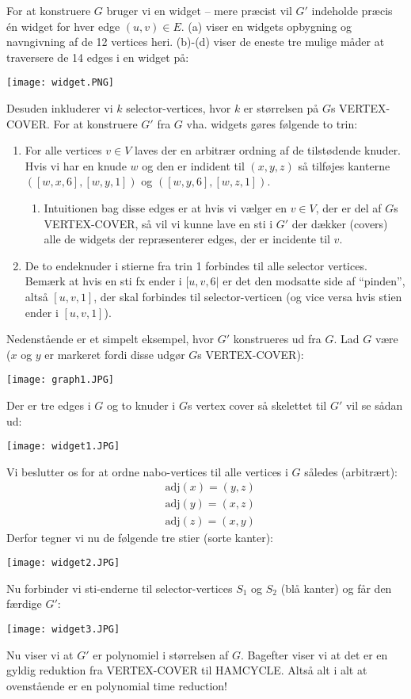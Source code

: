 For at konstruere $G$ bruger vi en widget -- mere præcist vil $G'$ indeholde præcis én widget for hver edge $(u,v) \in E$. (a) viser en widgets opbygning og navngivning af de 12 vertices heri. (b)-(d) viser de eneste tre mulige måder at traversere de 14 edges i en widget på:
\begin{center}
	\texttt{[image: widget.PNG]}
\end{center}
Desuden inkluderer vi $k$ selector-vertices, hvor $k$ er størrelsen på $G$s VERTEX-COVER. For at konstruere $G'$ fra $G$ vha. widgets gøres følgende to trin:
\begin{enumerate}
	\item For alle vertices $v \in V$ laves der en arbitrær ordning af de tilstødende knuder. Hvis vi har en knude $w$ og den er indident til $(x,y,z)$ så tilføjes kanterne $([w,x,6],[w,y,1])$ og $([w,y,6],[w,z,1])$.
	\begin{enumerate}
		\item Intuitionen bag disse edges er at hvis vi vælger en $v \in V$, der er del af $G$s VERTEX-COVER, så vil vi kunne lave en sti i $G'$ der dækker (covers) alle de widgets der repræsenterer edges, der er incidente til $v$.
	\end{enumerate} 
	\item De to endeknuder i stierne fra trin 1 forbindes til alle selector vertices. Bemærk at hvis en sti fx ender i $[u,v,6|$ er det den modsatte side af ``pinden'', altså $[u,v,1]$, der skal forbindes til selector-verticen (og vice versa hvis stien ender i $[u,v,1]$).  
\end{enumerate}
Nedenstående er et simpelt eksempel, hvor $G'$ konstrueres ud fra $G$. Lad $G$ være ($x$ og $y$ er markeret fordi disse udgør $G$s VERTEX-COVER): 
\begin{center}
	\texttt{[image: graph1.JPG]}
\end{center}
Der er tre edges i $G$ og to knuder i $G$s vertex cover så skelettet til $G'$ vil se sådan ud: 
\begin{center}
	\texttt{[image: widget1.JPG]}
\end{center}
Vi beslutter os for at ordne nabo-vertices til alle vertices i $G$ således (arbitrært):
\begin{align*}
	&\text{adj}(x)=(y,z) \\	
	&\text{adj}(y)=(x,z) \\
	&\text{adj}(z)=(x,y)
\end{align*}
Derfor tegner vi nu de følgende tre stier (sorte kanter): 
\begin{center}
	\texttt{[image: widget2.JPG]}
\end{center}
Nu forbinder vi sti-enderne til selector-vertices $S_1$ og $S_2$ (blå kanter) og får den færdige $G'$: 
\begin{center}
	\texttt{[image: widget3.JPG]}
\end{center}
Nu viser vi at $G'$ er polynomiel i størrelsen af $G$. Bagefter viser vi at det er en gyldig reduktion fra VERTEX-COVER til HAMCYCLE. Altså alt i alt at ovenstående er en polynomial time reduction! \\

